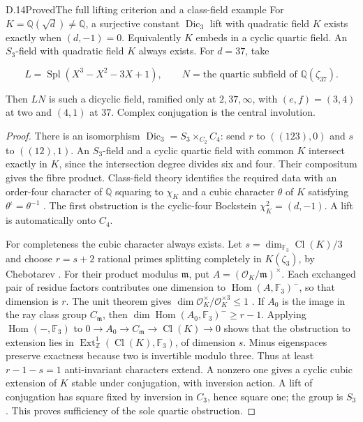 \begin{statement}{D.14}{Proved}{The full lifting criterion and a class-field example}
For $K=\mathbb Q(\sqrt d)\ne\mathbb Q$, a surjective
constant $\operatorname{Dic}_3$ lift with quadratic field
$K$ exists exactly when $(d,-1)=0$.
Equivalently $K$ embeds in a cyclic quartic field.
An $S_3$-field with quadratic field $K$ always exists.
For $d=37$, take

$$
L=\operatorname{Spl}(X^3-X^2-3X+1),\qquad
 N=\text{the quartic subfield of }\mathbb Q(\zeta_{37}).
$$

Then $LN$ is such a dicyclic field, ramified only at
$2,37,\infty$, with $(e,f)=(3,4)$ at two and $(4,1)$
at $37$. Complex conjugation is the central involution.
\end{statement}
\begin{proof}
There is an isomorphism
$\operatorname{Dic}_3=S_3\times_{C_2}C_4$:
send $r$ to $((123),0)$ and $s$ to $((12),1)$.
An $S_3$-field and a cyclic quartic field with common $K$
intersect exactly in $K$, since the intersection degree
divides six and four. Their compositum gives the fibre product.
Class-field theory identifies the required data with an
order-four character of $\mathbb Q$ squaring to $\chi_K$
and a cubic character $\theta$ of $K$ satisfying
$\theta^\iota=\theta^{-1}$
\cite[V, Theorems 5.3,5.5]{D_MilneCFT}.
The first obstruction is the cyclic-four Bockstein
$\chi_K^2=(d,-1)$. A lift is automatically onto $C_4$.

For completeness the cubic character always exists.
Let $s=\dim_{\mathbb F_3}\operatorname{Cl}(K)/3$ and
choose $r=s+2$ rational primes splitting completely in
$K(\zeta_3)$, by Chebotarev
\cite[V, Theorem 3.23]{D_MilneCFT}.
For their product modulus $\mathfrak m$, put
$A=(\mathcal O_K/\mathfrak m)^\times$.
Each exchanged pair of residue factors contributes one
dimension to $\operatorname{Hom}(A,\mathbb F_3)^-$,
so that dimension is $r$.
The unit theorem gives
$\dim\mathcal O_K^\times/\mathcal O_K^{\times3}\le1$
\cite[Theorem 5.1]{D_MilneANT}.
If $A_0$ is the image in the ray class group $C_{\mathfrak m}$,
then $\dim\operatorname{Hom}(A_0,\mathbb F_3)^-\ge r-1$.
Applying $\operatorname{Hom}(-,\mathbb F_3)$ to
$0\to A_0\to C_{\mathfrak m}\to\operatorname{Cl}(K)\to0$
shows that the obstruction to extension lies in
$\operatorname{Ext}^1_{\mathbb Z}(\operatorname{Cl}(K),\mathbb F_3)$,
of dimension $s$.
Minus eigenspaces preserve exactness because two is invertible
modulo three. Thus at least $r-1-s=1$ anti-invariant characters
extend. A nonzero one gives a cyclic cubic extension of $K$
stable under conjugation, with inversion action.
A lift of conjugation has square fixed by inversion in $C_3$,
hence square one; the group is $S_3$.
This proves sufficiency of the sole quartic obstruction.


\end{proof}

